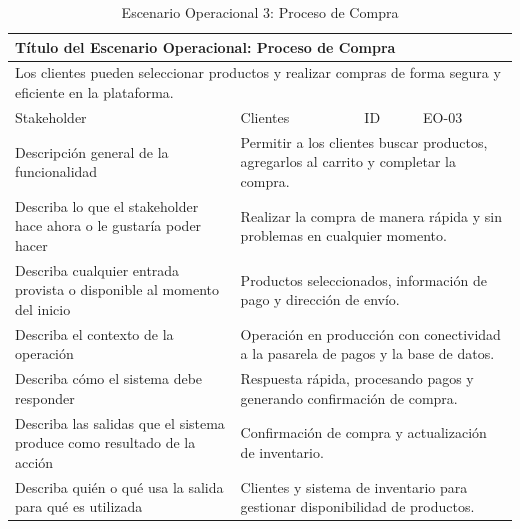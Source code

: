 \documentclass[12pt]{article}
\begin{document}
\begin{table}[H]
    \centering
    \begin{tabular}{|p{4cm}|p{4cm}|p{4cm}|p{4cm}|}
        \hline
        \multicolumn{4}{|l|}{\cellcolor{teal!50}\textbf{Título del Escenario Operacional: Proceso de Compra}} \\ \hline
        \multicolumn{4}{|p{16cm}|}{Los clientes pueden seleccionar productos y realizar compras de forma segura y eficiente en la plataforma.} \\ \hline
        \multicolumn{1}{|p{4cm}|}{\cellcolor{teal!50}Stakeholder} & \multicolumn{1}{p{6cm}|}{Clientes} & \multicolumn{1}{|p{2cm}|}{\cellcolor{teal!50}ID} & \multicolumn{1}{p{4cm}|}{EO-03} \\ \hline
        \multicolumn{1}{|p{4cm}|}{\cellcolor{teal!50}Descripción general de la funcionalidad} & \multicolumn{3}{p{12cm}|}{Permitir a los clientes buscar productos, agregarlos al carrito y completar la compra.} \\ \hline
        \multicolumn{1}{|p{4cm}|}{\cellcolor{teal!50}Describa lo que el stakeholder hace ahora o le gustaría poder hacer} & \multicolumn{3}{p{12cm}|}{Realizar la compra de manera rápida y sin problemas en cualquier momento.} \\ \hline
        \multicolumn{1}{|p{4cm}|}{\cellcolor{teal!50}Describa cualquier entrada provista o disponible al momento del inicio} & \multicolumn{3}{p{12cm}|}{Productos seleccionados, información de pago y dirección de envío.} \\ \hline
        \multicolumn{1}{|p{4cm}|}{\cellcolor{teal!50}Describa el contexto de la operación} & \multicolumn{3}{p{12cm}|}{Operación en producción con conectividad a la pasarela de pagos y la base de datos.} \\ \hline
        \multicolumn{1}{|p{4cm}|}{\cellcolor{teal!50}Describa cómo el sistema debe responder} & \multicolumn{3}{p{12cm}|}{Respuesta rápida, procesando pagos y generando confirmación de compra.} \\ \hline
        \multicolumn{1}{|p{4cm}|}{\cellcolor{teal!50}Describa las salidas que el sistema produce como resultado de la acción} & \multicolumn{3}{p{12cm}|}{Confirmación de compra y actualización de inventario.} \\ \hline
        \multicolumn{1}{|p{4cm}|}{\cellcolor{teal!50}Describa quién o qué usa la salida para qué es utilizada} & \multicolumn{3}{p{12cm}|}{Clientes y sistema de inventario para gestionar disponibilidad de productos.} \\ \hline
    \end{tabular}
    \caption{Escenario Operacional 3: Proceso de Compra}
    \label{tab:escenario_operacional_3}
\end{table}
\end{document}
